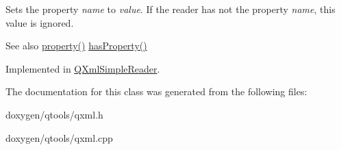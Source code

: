 Sets the property {\itshape name} to {\itshape value}. If the reader has not the property {\itshape name}, this value is ignored.

\begin{DoxySeeAlso}{See also}
\mbox{\hyperlink{class_q_xml_reader_a88ea75a8b783f8ef6959d9d83402c579}{property()}} \mbox{\hyperlink{class_q_xml_reader_ac26bf52bfab045196e8adf980e92bab6}{has\+Property()}} 
\end{DoxySeeAlso}


Implemented in \mbox{\hyperlink{class_q_xml_simple_reader_abd76c9f09aac5584602b7dd440a9074a}{Q\+Xml\+Simple\+Reader}}.



The documentation for this class was generated from the following files\+:\begin{DoxyCompactItemize}
\item 
doxygen/qtools/qxml.\+h\item 
doxygen/qtools/qxml.\+cpp\end{DoxyCompactItemize}
